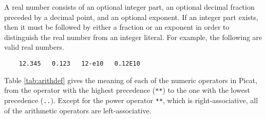 A real number consists of an optional integer part, an optional decimal fraction preceded by a decimal point, and an optional exponent. If an integer part exists, then it must be followed by either a fraction or an exponent in order to distinguish the real number from an integer literal. For example, the following are valid real numbers.
\begin{verbatim}
    12.345   0.123   12-e10   0.12E10
\end{verbatim}

Table \ref{tab:arithdef} gives the meaning of each of the numeric operators in Picat, from the operator with the highest precedence (\verb+**+) to the one with the lowest precedence (\verb+..+). Except for the power operator \verb+**+, which is right-associative, all of the arithmetic operators are left-associative. 

